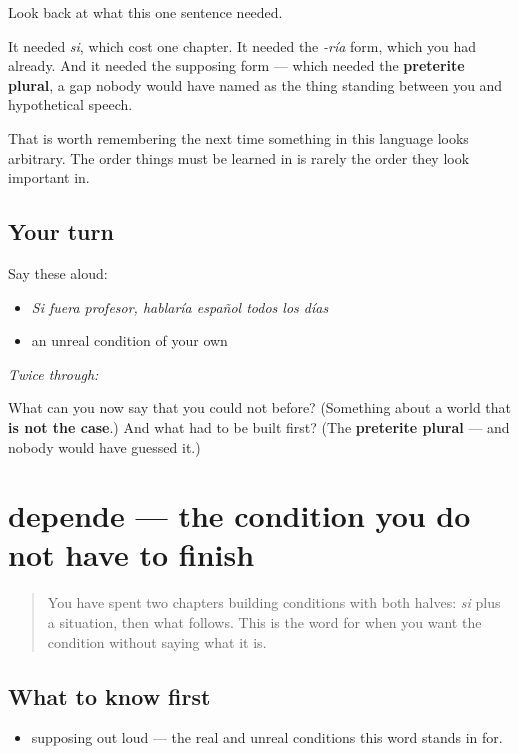 \begin{grammarlens}[title={Grammar Lens: what the climb cost}]
Look back at what this one sentence needed.

It needed \emph{si}, which cost one chapter. It needed the \emph{-ría} form, which you had already. And it needed the supposing form — which needed the \textbf{preterite plural}, a gap nobody would have named as the thing standing between you and hypothetical speech.

That is worth remembering the next time something in this language looks arbitrary. The order things must be learned in is rarely the order they look important in.
\end{grammarlens}

\subsection*{Your turn}
Say these aloud:

\begin{itemize}
\raggedright
  \item \emph{Si fuera profesor, hablaría español todos los días}
  \item an unreal condition of your own
\end{itemize}

\emph{Twice through:}

\begin{tcolorbox}[breakable,colback=teal!4,colframe=teal!35!black,title={Before you move on}]
What can you now say that you could not before? (Something about a world that \textbf{is not the case}.) And what had to be built first? (The \textbf{preterite plural} — and nobody would have guessed it.)
\end{tcolorbox}
\section[depende]{depende — the condition you do not have to finish}

\label{lesson:ES-C56-depende}



\begin{quote}
You have spent two chapters building conditions with both halves: \emph{si} plus a situation, then what follows. This is the word for when you want the condition without saying what it is.
\end{quote}

\subsection*{What to know first}
\begin{itemize}
\raggedright
  \item supposing out loud — the real and unreal conditions this word stands in for.
\end{itemize}

